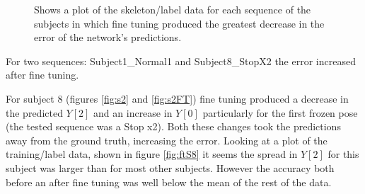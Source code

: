\documentclass[11pt]{article} %
\begin{document}
\begin{figure}
\centering
{}%
\qquad%
%
\caption{Shows a plot of the skeleton/label data for each sequence of the subjects in which fine tuning produced the greatest decrease in the error of the network's predictions. }
\end{figure}

For two sequences: Subject1\_Normal1 and Subject8\_StopX2 the error increased after fine tuning.

For subject 8 (figures \ref{fig:s2} and \ref{fig:s2FT}) fine tuning produced a decrease in the predicted $Y[2]$ and an increase in $Y[0]$ particularly for the first frozen pose (the tested sequence was a Stop x2). Both these changes took the predictions away from the ground truth, increasing the error. Looking at a plot of the training/label data, shown in figure \ref{fig:ftS8} it seems the spread in $Y[2]$ for this subject was larger than for most other subjects. However the accuracy both before an after fine tuning was well below the mean of the rest of the data.
\end{document}
